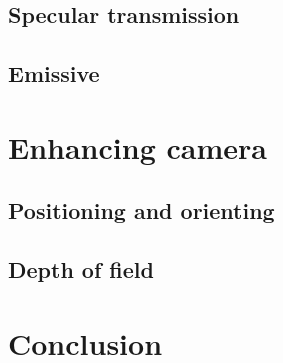 \documentclass[]{article}
\begin{document}
		\subsection{Specular transmission}
		\subsection{Emissive}
	\section{Enhancing camera}
		\subsection{Positioning and orienting}
		\subsection{Depth of field}
	\section{Conclusion}
	
	\clearpage
	{}
	
		
\end{document}
